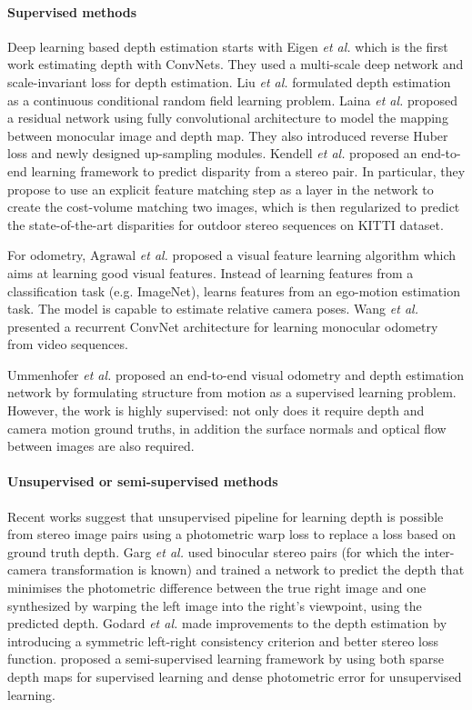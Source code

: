 \documentclass[10pt,twocolumn,letterpaper]{article}
\begin{document}
\paragraph{Supervised methods}
Deep learning based depth estimation starts with Eigen \textit{et al.} \cite{eigen2014depth} which is the first work estimating depth with ConvNets. They used a multi-scale deep network and scale-invariant loss for depth estimation. 
Liu \textit{et al.}\cite{liu2015depth} \cite{liu2016depth} formulated depth estimation as a continuous conditional random field learning problem. 
Laina \textit{et al.} \cite{laina2016deeperdepth} proposed a residual network using fully convolutional architecture to model the mapping between monocular image and depth map. They also introduced reverse Huber loss and newly designed up-sampling modules. 
Kendell  \textit{et al.}\cite{kendall2017deepstereo} proposed an end-to-end learning framework to predict disparity from a stereo pair. In particular, they propose to use an explicit feature matching step as a layer in the network to create the cost-volume matching two images, which is then regularized to predict the state-of-the-art disparities for outdoor stereo sequences on KITTI dataset. 


For odometry, Agrawal \textit{et al.} \cite{agrawal2015seebymoving} proposed a visual feature learning algorithm which aims at learning good visual features. Instead of learning features from a classification task (e.g. ImageNet\cite{ILSVRC15}), \cite{agrawal2015seebymoving} learns features from an ego-motion estimation task. The model is capable to estimate relative camera poses.
Wang \textit{et al.}\cite{wang2017deepvo} presented a recurrent ConvNet architecture for learning monocular odometry from video sequences.

Ummenhofer \textit{et al.} \cite{ummenhofer2016demon} proposed an end-to-end visual odometry and depth estimation network by formulating structure from motion as a supervised learning problem. However, the work is highly supervised: not only does it require depth and camera motion ground truths, in addition the surface normals and optical flow between images are also required. 

\paragraph{Unsupervised or semi-supervised methods}
Recent works suggest that unsupervised pipeline for learning depth is possible from stereo image pairs using a photometric warp loss to replace a loss based on ground truth depth. Garg \textit{et al.} \cite{garg2016depth} used binocular stereo pairs (for which the inter-camera transformation is known) and trained a network to predict the depth that minimises the photometric difference between the true right image and one synthesized by warping the left image into the right's viewpoint, using the predicted depth. Godard \textit{et al.} \cite{godard2016depth} made improvements to the depth estimation by introducing a symmetric left-right consistency criterion and better stereo loss function. \cite{kuznietsov2017semi} proposed a semi-supervised learning framework by using both sparse depth maps for supervised learning and dense photometric error for unsupervised learning.
\end{document}

